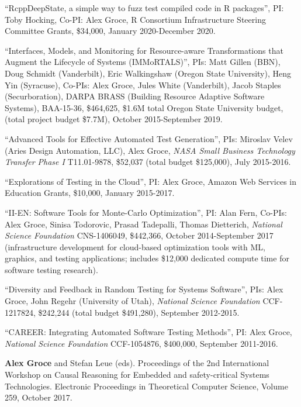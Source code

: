 \documentclass[ComputerScience]{vita}
\begin{document}
\begin{vita}
\begin{Funding}
\item ``{RcppDeepState}, a simple way to fuzz test compiled code in {R} packages'', PI: Toby Hocking, Co-PI: Alex Groce, R Consortium Infrastructure Steering Committee Grants, \$34,000, January 2020-December 2020.
\item ``Interfaces, Models, and Monitoring for Resource-aware Transformations that Augment the Lifecycle of Systems (IMMoRTALS)'', PIs: Matt Gillen (BBN), Doug Schmidt (Vanderbilt), Eric Walkingshaw (Oregon State University), Heng Yin (Syracuse), Co-PIs: Alex Groce, Jules White (Vanderbilt), Jacob Staples (Securboration), DARPA BRASS (Building Resource Adaptive Software Systems), BAA-15-36, \$464,625, \$1.6M total Oregon State University budget, (total project budget \$7.7M), October 2015-September 2019.
\item ``Advanced Tools for Effective Automated Test Generation'', PIs: Miroslav Velev (Aries Design Automation, LLC), Alex Groce, \emph{NASA Small Business Technology Transfer Phase I} T11.01-9878, \$52,037 (total budget \$125,000), July 2015-2016.
\item ``Explorations of Testing in the Cloud'', PI: Alex Groce, Amazon Web Services in Education Grants, \$10,000, January 2015-2017.
\item ``II-EN: Software Tools for Monte-Carlo Optimization'', PI: Alan Fern, Co-PIs: Alex Groce, Sinisa Todorovic, Prasad Tadepalli, Thomas Dietterich, \emph{National Science Foundation} CNS-1406049, \$442,366, October 2014-September 2017 (infrastructure development for cloud-based optimization tools with ML, graphics, and testing applications; includes \$12,000 dedicated compute time for software testing research).
\item ``Diversity and Feedback in Random Testing for Systems Software'', PIs: Alex Groce, John Regehr (University of Utah), \emph{National Science Foundation} CCF-1217824, \$242,244 (total budget \$491,280), September 2012-2015.
\item ``CAREER: Integrating Automated Software Testing Methods'', PI: Alex Groce, \emph{National Science Foundation} CCF-1054876, \$400,000, September 2011-2016.
\end{Funding}

\begin{Books, Edited Volumes}

\item
{\bf Alex Groce} and Stefan Leue (eds).
\newblock Proceedings of the 2nd International Workshop on 
Causal Reasoning for Embedded and safety-critical Systems Technologies.
\newblock Electronic Proceedings in Theoretical Computer Science, Volume 259, October 2017.


\end{Books, Edited Volumes}
\end{vita}
\end{document}
